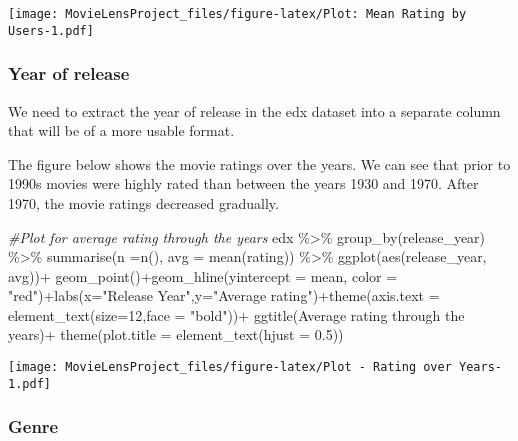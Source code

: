 \documentclass[
]{article}
\newenvironment{Shaded}{\begin{snugshade}}{\end{snugshade}}
\newcommand{\AttributeTok}[1]{\textcolor[rgb]{0.77,0.63,0.00}{#1}}
\newcommand{\CommentTok}[1]{\textcolor[rgb]{0.56,0.35,0.01}{\textit{#1}}}
\newcommand{\DecValTok}[1]{\textcolor[rgb]{0.00,0.00,0.81}{#1}}
\newcommand{\FloatTok}[1]{\textcolor[rgb]{0.00,0.00,0.81}{#1}}
\newcommand{\FunctionTok}[1]{\textcolor[rgb]{0.00,0.00,0.00}{#1}}
\newcommand{\NormalTok}[1]{#1}
\newcommand{\SpecialCharTok}[1]{\textcolor[rgb]{0.00,0.00,0.00}{#1}}
\newcommand{\StringTok}[1]{\textcolor[rgb]{0.31,0.60,0.02}{#1}}
\begin{document}
\texttt{[image: MovieLensProject\_files/figure-latex/Plot: Mean Rating by Users-1.pdf]}

\hypertarget{year-of-release}{%
\subsubsection{Year of release}\label{year-of-release}}

We need to extract the year of release in the edx dataset into a
separate column that will be of a more usable format.

The figure below shows the movie ratings over the years. We can see that
prior to 1990s movies were highly rated than between the years 1930 and
1970. After 1970, the movie ratings decreased gradually.

\begin{Shaded}
\begin{Highlighting}[]
\CommentTok{\#Plot for average rating through the years}
\NormalTok{edx }\SpecialCharTok{\%\textgreater{}\%} \FunctionTok{group\_by}\NormalTok{(release\_year) }\SpecialCharTok{\%\textgreater{}\%}
  \FunctionTok{summarise}\NormalTok{(}\AttributeTok{n =}\FunctionTok{n}\NormalTok{(), }\AttributeTok{avg =} \FunctionTok{mean}\NormalTok{(rating)) }\SpecialCharTok{\%\textgreater{}\%}
  \FunctionTok{ggplot}\NormalTok{(}\FunctionTok{aes}\NormalTok{(release\_year, avg))}\SpecialCharTok{+}
  \FunctionTok{geom\_point}\NormalTok{()}\SpecialCharTok{+}\FunctionTok{geom\_hline}\NormalTok{(}\AttributeTok{yintercept =}\NormalTok{ mean, }\AttributeTok{color =} \StringTok{"red"}\NormalTok{)}\SpecialCharTok{+}\FunctionTok{labs}\NormalTok{(}\AttributeTok{x=}\StringTok{"Release Year"}\NormalTok{,}\AttributeTok{y=}\StringTok{"Average rating"}\NormalTok{)}\SpecialCharTok{+}\FunctionTok{theme}\NormalTok{(}\AttributeTok{axis.text =} \FunctionTok{element\_text}\NormalTok{(}\AttributeTok{size=}\DecValTok{12}\NormalTok{,}\AttributeTok{face =} \StringTok{"bold"}\NormalTok{))}\SpecialCharTok{+}
  \FunctionTok{ggtitle}\NormalTok{(}\StringTok{\textquotesingle{}Average rating through the years\textquotesingle{}}\NormalTok{)}\SpecialCharTok{+}
  \FunctionTok{theme}\NormalTok{(}\AttributeTok{plot.title =} \FunctionTok{element\_text}\NormalTok{(}\AttributeTok{hjust =} \FloatTok{0.5}\NormalTok{))}
\end{Highlighting}
\end{Shaded}

\texttt{[image: MovieLensProject\_files/figure-latex/Plot - Rating over Years-1.pdf]}

\hypertarget{genre}{%
\subsubsection{Genre}\label{genre}}
\end{document}
